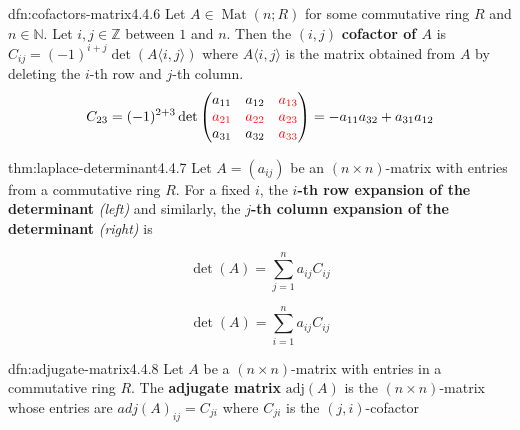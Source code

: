 \documentclass[landscape, 8pt]{extarticle}
\DeclareMathOperator{\Mat}{Mat}
\begin{document}
\begin{multicols}{3}
\begin{dfn}{dfn:cofactors-matrix}{4.4.6}
    Let $A \in \Mat(n;R)$ for some commutative ring $R$ and $n\in \mathbb{N}$. Let $i,j\in\mathbb{Z}$ between $1$ and $n$. Then the $(i, j)$ \textbf{cofactor of $A$} is $C_{ij} = (-1)^{i + j} \det(A\langle i,j \rangle)$ where $A\langle i, j \rangle$ is the matrix obtained from $A$ by deleting the $i$-th row and $j$-th column.
    \[C_{23} = (-1)^{2 + 3} \det \begin{pmatrix}
        a_{11} & a_{12}& \textcolor{red}{a_{13}}\\
        \textcolor{red}{a_{21}}& \textcolor{red}{a_{22}}& \textcolor{red}{a_{23}}\\
        a_{31}& a_{32}& \textcolor{red}{a_{33}}
    \end{pmatrix} = -a_{11}a_{32} + a_{31}a_{12}\]
\end{dfn}

\vspace{-4pt}
\begin{thm}{thm:laplace-determinant}{4.4.7}
    Let $A = (a_{ij})$ be an $(n \times n)$-matrix with entries from a commutative ring $R$. For a fixed $i$, the \textbf{$i$-th row expansion of the determinant} \textit{(left)} and similarly, the \textbf{$j$-th column expansion of the determinant} \textit{(right)} is
    
    \vspace{-17pt}
    \setlength{\columnseprule}{0.5pt}
    \begin{multicols}{2}
        \begin{center}
            \[\det(A) = \sum_{j = 1}^{n}a_{ij}C_{ij}\]
        \end{center}

        \columnbreak

        \begin{center}
            \[\det(A) = \sum_{i = 1}^{n} a_{ij} C_{ij}\]
        \end{center}
    \end{multicols}

\end{thm}

\begin{dfn}{dfn:adjugate-matrix}{4.4.8}
    Let $A$ be a $(n \times n)$-matrix with entries in a commutative ring $R$. The \textbf{adjugate matrix} $\text{adj}(A)$ is the $(n \times n)$-matrix whose entries are $adj(A)_{ij} = C_{ji}$ where $C_{ji}$ is the $(j, i)$-cofactor
\end{dfn}


\end{multicols}
\end{document}
